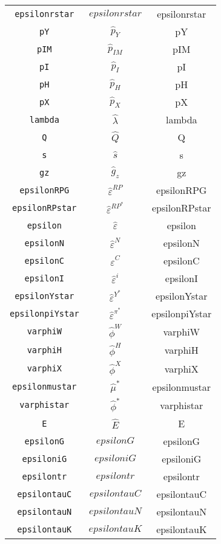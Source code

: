 \begin{center}
\begin{longtable}{ccc}
\texttt{epsilonrstar} & $epsilonrstar$ & epsilonrstar\\
\texttt{pY} & $\hat{p}_Y$ & pY\\
\texttt{pIM} & $\hat{p}_{IM}$ & pIM\\
\texttt{pI} & $\hat{p}_I$ & pI\\
\texttt{pH} & $\hat{p}_H$ & pH\\
\texttt{pX} & $\hat{p}_X$ & pX\\
\texttt{lambda} & $\hat{\lambda}$ & lambda\\
\texttt{Q} & $\hat{Q}$ & Q\\
\texttt{s} & $\hat{s}$ & s\\
\texttt{gz} & ${\hat{g}_z}$ & gz\\
\texttt{epsilonRPG} & $\hat{\varepsilon}^{RP}$ & epsilonRPG\\
\texttt{epsilonRPstar} & $\hat{\varepsilon}^{RP^*}$ & epsilonRPstar\\
\texttt{epsilon} & $\hat{\varepsilon}$ & epsilon\\
\texttt{epsilonN} & $\hat{\varepsilon}^N$ & epsilonN\\
\texttt{epsilonC} & $\hat{\varepsilon}^C$ & epsilonC\\
\texttt{epsilonI} & $\hat{\varepsilon}^i$ & epsilonI\\
\texttt{epsilonYstar} & $\hat{\varepsilon}^{Y^*}$ & epsilonYstar\\
\texttt{epsilonpiYstar} & $\hat{\varepsilon}^{\pi^*}$ & epsilonpiYstar\\
\texttt{varphiW} & $\hat{\phi}^W$ & varphiW\\
\texttt{varphiH} & $\hat{\phi}^H$ & varphiH\\
\texttt{varphiX} & $\hat{\phi}^X$ & varphiX\\
\texttt{epsilonmustar} & $\hat{\mu}^*$ & epsilonmustar\\
\texttt{varphistar} & $\hat{\phi}^*$ & varphistar\\
\texttt{E} & $\hat{E}$ & E\\
\texttt{epsilonG} & $epsilonG$ & epsilonG\\
\texttt{epsiloniG} & $epsiloniG$ & epsiloniG\\
\texttt{epsilontr} & $epsilontr$ & epsilontr\\
\texttt{epsilontauC} & $epsilontauC$ & epsilontauC\\
\texttt{epsilontauN} & $epsilontauN$ & epsilontauN\\
\texttt{epsilontauK} & $epsilontauK$ & epsilontauK\\

\end{longtable}
\end{center}

